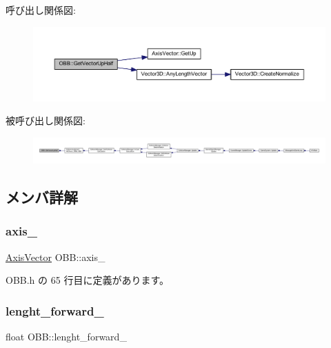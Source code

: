 呼び出し関係図\+:\nopagebreak
\begin{figure}[H]
\begin{center}
\leavevmode
\includegraphics[width=350pt]{class_o_b_b_a48255d7b9af2d2ea109de41787c30a3a_cgraph}
\end{center}
\end{figure}
被呼び出し関係図\+:
\nopagebreak
\begin{figure}[H]
\begin{center}
\leavevmode
\includegraphics[width=350pt]{class_o_b_b_a48255d7b9af2d2ea109de41787c30a3a_icgraph}
\end{center}
\end{figure}


\subsection{メンバ詳解}
\mbox{\label{class_o_b_b_ab002fad8cf0a9a08fc50407dc849aab1}} 
\subsubsection{\texorpdfstring{axis\+\_\+}{axis\_}}
{\footnotesize\ttfamily \mbox{\hyperlink{class_axis_vector}{Axis\+Vector}} O\+B\+B\+::axis\+\_\+}



 O\+B\+B.\+h の 65 行目に定義があります。

\mbox{\label{class_o_b_b_a999f5165cf4cb28b7b59a75e81613bab}} 
\subsubsection{\texorpdfstring{lenght\+\_\+forward\+\_\+}{lenght\_forward\_}}
{\footnotesize\ttfamily float O\+B\+B\+::lenght\+\_\+forward\+\_\+}



